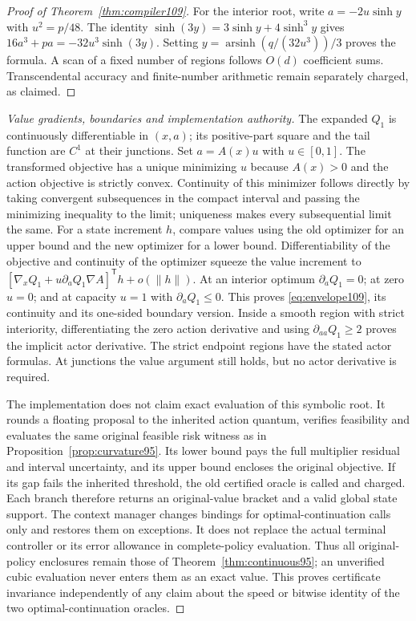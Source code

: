 \begin{proof}[Proof of Theorem~\ref{thm:compiler109}]
For the interior root, write $a=-2u\sinh y$ with $u^2=p/48$. The identity $\sinh(3y)=3\sinh y+4\sinh^3y$ gives
$16a^3+pa=-32u^3\sinh(3y)$. Setting $y=\operatorname{arsinh}(q/(32u^3))/3$ proves the formula. A scan of a fixed number of regions follows $O(d)$ coefficient sums. Transcendental accuracy and finite-number arithmetic remain separately charged, as claimed.
\end{proof}

\begin{proof}[Value gradients, boundaries and implementation authority]
The expanded $Q_1$ is continuously differentiable in $(x,a)$; its positive-part square and the tail function are $C^1$ at their junctions. Set $a=A(x)u$ with $u\in[0,1]$. The transformed objective has a unique minimizing $u$ because $A(x)>0$ and the action objective is strictly convex. Continuity of this minimizer follows directly by taking convergent subsequences in the compact interval and passing the minimizing inequality to the limit; uniqueness makes every subsequential limit the same. For a state increment $h$, compare values using the old optimizer for an upper bound and the new optimizer for a lower bound. Differentiability of the objective and continuity of the optimizer squeeze the value increment to
$[\nabla_xQ_1+u\partial_aQ_1\nabla A]^{\mathsf T}h+o(\|h\|)$.
At an interior optimum $\partial_aQ_1=0$; at zero $u=0$; and at capacity $u=1$ with $\partial_aQ_1\le0$. This proves \eqref{eq:envelope109}, its continuity and its one-sided boundary version. Inside a smooth region with strict interiority, differentiating the zero action derivative and using $\partial_{aa}Q_1\ge2$ proves the implicit actor derivative. The strict endpoint regions have the stated actor formulas. At junctions the value argument still holds, but no actor derivative is required.

The implementation does not claim exact evaluation of this symbolic root. It rounds a floating proposal to the inherited action quantum, verifies feasibility and evaluates the same original feasible risk witness as in Proposition~\ref{prop:curvature95}. Its lower bound pays the full multiplier residual and interval uncertainty, and its upper bound encloses the original objective. If its gap fails the inherited threshold, the old certified oracle is called and charged. Each branch therefore returns an original-value bracket and a valid global state support. The context manager changes bindings for optimal-continuation calls only and restores them on exceptions. It does not replace the actual terminal controller or its error allowance in complete-policy evaluation. Thus all original-policy enclosures remain those of Theorem~\ref{thm:continuous95}; an unverified cubic evaluation never enters them as an exact value. This proves certificate invariance independently of any claim about the speed or bitwise identity of the two optimal-continuation oracles.
\end{proof}

